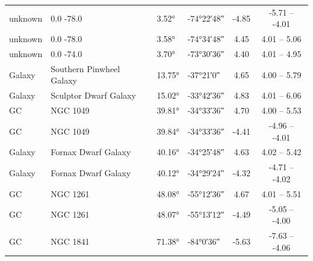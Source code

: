 \begin{table}[H]
\begin{tabular}[t]{l L{2cm} l l c c}
        \midrule[0.5pt]
        unknown                          & 0.0 -78.0                & \ang{3.52}                & \ang{-74;22;48}            & -4.85                  & -5.71 -- -4.01                   \\
        unknown                          & 0.0 -78.0                & \ang{3.58}                & \ang{-74;34;48}            & 4.45                   & 4.01 -- 5.06                     \\
        unknown                          & 0.0 -74.0                & \ang{3.70}                & \ang{-73;30;36}            & 4.40                   & 4.01 -- 4.95                     \\
        Galaxy                           & Southern Pinwheel Galaxy & \ang{13.75}               & \ang{-37;21;0}             & 4.65                   & 4.00 -- 5.79                     \\
        Galaxy                           & Sculptor Dwarf Galaxy    & \ang{15.02}               & \ang{-33;42;36}            & 4.83                   & 4.01 -- 6.06                     \\
        GC                               & NGC 1049                 & \ang{39.81}               & \ang{-34;33;36}            & 4.70                   & 4.00 -- 5.53                     \\
        GC                               & NGC 1049                 & \ang{39.84}               & \ang{-34;33;36}            & -4.41                  & -4.96 -- -4.01                   \\
        Galaxy                           & Fornax Dwarf Galaxy      & \ang{40.16}               & \ang{-34;25;48}            & 4.63                   & 4.02 -- 5.42                     \\
        Galaxy                           & Fornax Dwarf Galaxy      & \ang{40.12}               & \ang{-34;29;24}            & -4.32                  & -4.71 -- -4.02                   \\
        GC                               & NGC 1261                 & \ang{48.08}               & \ang{-55;12;36}            & 4.67                   & 4.01 -- 5.51                     \\
        GC                               & NGC 1261                 & \ang{48.07}               & \ang{-55;13;12}            & -4.49                  & -5.05 -- -4.00                   \\
        GC                               & NGC 1841                 & \ang{71.38}               & \ang{-84;0;36}             & -5.63                  & -7.63 -- -4.06                   \\


\end{tabular}
\end{table}

